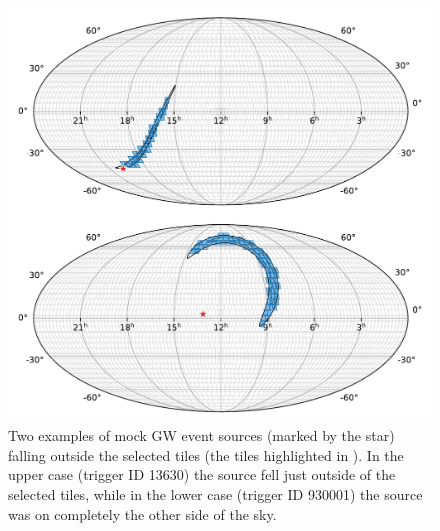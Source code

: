 \begin{colsection}
\begin{figure}[p]
    \begin{center}
        \includegraphics[width=\linewidth]{images/non_selected.pdf}
    \end{center}
    \caption[Examples of mock GW event sources falling outside of the selected tiles]{
        Two examples of mock GW event sources (marked by the  star) falling outside the selected tiles (the tiles highlighted in ). In the upper case (trigger ID 13630) the source fell just outside of the selected tiles, while in the lower case (trigger ID 930001) the source was on completely the other side of the sky.
    }\label{fig:poor_selection}
\end{figure}

\clearpage

\end{colsection}


